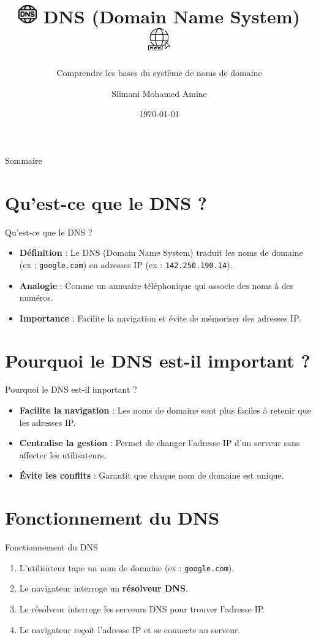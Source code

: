 \documentclass{clbeamer2024}
\title{
	\includegraphics[width=0.8cm]{logos/dns.png} \hfill
	DNS (Domain Name System) \hfill
	\includegraphics[width=0.95cm]{logos/browser.png}
}
\subtitle{Comprendre les bases du système de noms de domaine}
\author{Slimani Mohamed Amine}
\institute{}
\date{\today}
\begin{document}
	\setcounter{framenumber}{-1}
	\frame{\titlepage}
	
	
	
	\begin{frame}{Sommaire}
		\tableofcontents
	\end{frame}
	
	\section{Qu'est-ce que le DNS ?}
	\begin{frame}{Qu'est-ce que le DNS ?}
		\begin{itemize}
			\item \textbf{Définition} : Le DNS (Domain Name System) traduit les noms de domaine (ex : \texttt{google.com}) en adresses IP (ex : \texttt{142.250.190.14}).
			\item \textbf{Analogie} : Comme un annuaire téléphonique qui associe des noms à des numéros.
			\item \textbf{Importance} : Facilite la navigation et évite de mémoriser des adresses IP.
		\end{itemize}
	\end{frame}
	
	\section{Pourquoi le DNS est-il important ?}
	\begin{frame}{Pourquoi le DNS est-il important ?}
		\begin{itemize}
			\item \textbf{Facilite la navigation} : Les noms de domaine sont plus faciles à retenir que les adresses IP.
			\item \textbf{Centralise la gestion} : Permet de changer l'adresse IP d'un serveur sans affecter les utilisateurs.
			\item \textbf{Évite les conflits} : Garantit que chaque nom de domaine est unique.
		\end{itemize}
	\end{frame}
	
	\section{Fonctionnement du DNS}
	\begin{frame}{Fonctionnement du DNS}
		\begin{enumerate}
			\item L'utilisateur tape un nom de domaine (ex : \texttt{google.com}).
			\item Le navigateur interroge un \textbf{résolveur DNS}.
			\item Le résolveur interroge les serveurs DNS pour trouver l'adresse IP.
			\item Le navigateur reçoit l'adresse IP et se connecte au serveur.
		\end{enumerate}
	\end{frame}
	
\end{document}
